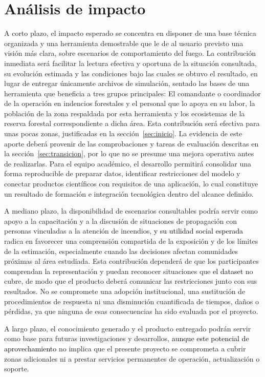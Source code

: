 \clearpage
\section{Análisis de impacto}\label{sec:impacto}

  
    A corto plazo, el impacto esperado se concentra en disponer de una base técnica organizada y una herramienta demostrable que le de al usuario previsto una visión más clara, sobre escenarios de comportamiento del fuego. La contribución inmediata será facilitar la lectura efectiva y oportuna de la situación consultada, su evolución estimada y las condiciones bajo las cuales se obtuvo el resultado, en lugar de entregar únicamente archivos de simulación, sentado las bases de una herramienta que beneficia a tres grupos principales: El comandante o coordinador de la operación en indencios forestales y el personal que lo apoya en su labor, la población de la zona respaldada por esta herramienta y los ecosistemas de la reserva forestal correspondiente a dicha área. Esta contribución será efectiva para unas pocas zonas, justificadas en la sección~\ref{sec:inicio}. La evidencia de este aporte deberá provenir de las comprobaciones y tareas de evaluación descritas en la sección~\ref{sec:transicion}, por lo que no se presume una mejora operativa antes de realizarlas. Para el equipo académico, el desarrollo permitirá consolidar una forma reproducible de preparar datos, identificar restricciones del modelo y conectar productos científicos con requisitos de una aplicación, lo cual constituye un resultado de formación e integración tecnológica dentro del alcance definido.

A mediano plazo, la disponibilidad de escenarios consultables podría servir como apoyo a la capacitación y a la discusión de situaciones de propagación con personas vinculadas a la atención de incendios, \textcolor{black}{y su utilidad social esperada} radica en favorecer una comprensión compartida de la exposición y de los límites de la estimación, especialmente cuando las decisiones afectan comunidades próximas al área estudiada. Esta contribución dependerá de que los participantes comprendan la representación y puedan reconocer situaciones que \textcolor{black}{el dataset} no cubre, de modo que el producto deberá comunicar las restricciones junto con sus resultados. No se compromete una adopción institucional, una sustitución de procedimientos de respuesta ni una disminución cuantificada de tiempos, daños o pérdidas, ya que ninguna de esas consecuencias ha sido evaluada por el proyecto.

A largo plazo, el conocimiento generado y el producto entregado podrán servir como base para futuras investigaciones y desarrollos, \textcolor{black}{aunque este potencial de aprovechamiento} no implica que el presente proyecto se comprometa a cubrir zonas adicionales ni a prestar servicios permanentes de operación, actualización o soporte.
